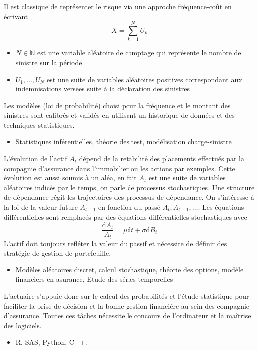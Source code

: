 \documentclass[8pt,notheorems]{beamer}
\theoremstyle{definition}
\theoremstyle{example}
\theoremstyle{mystyle}
\theoremstyle{plain}
\begin{document}
\begin{frame}[allowframebreaks]
Il est classique de représenter le risque via une approche fréquence-coût en écrivant 
$$
X = \sum_{k=1}^{N}U_k
$$ 
\begin{itemize}
    \item $N\in\mathbb{N}$ est une variable aléatoire de comptage qui représente le nombre de sinistre sur la période
    \item $U_1,\ldots,U_N$ est une suite de variables aléatoires positives correspondant aux indemnisations versées suite à la déclaration des sinistres
\end{itemize}
Les modèles (loi de probabilité) choisi pour la fréquence et le montant des sinistres sont calibrés et validés en utilisant un historique de données et des techniques statistiques.
\begin{itemize}
    \item Statistiques inférentielles, théorie des test, modélisation charge-sinistre
\end{itemize}
\end{frame}
\begin{frame}[allowframebreaks]
L'évolution de l'actif $A_t$ dépend de la retabilité des placements effectués par la compagnie d'assurance dans l'immobilier ou les actions par exemples. Cette évolution est aussi soumis à un aléa, en fait $A_t$ est une suite de variables aléatoires indicés par le temps, on parle de processus stochastiques. Une structure de dépendance régit les trajectoires des processus de dépendance. On s'intéresse à la loi de la valeur future $A_{t+1}$ en fonction du passé $A_{t}, A_{t-1},\ldots$. Les équations différentielles sont remplacés par des équations différentielles stochastiques avec
$$
\frac{\text{d}A_t}{A_t} = \mu\text{d}t+\sigma\text{d}B_t
$$
L'actif doit toujours refléter la valeur du passif et nécessite de définir des stratégie de gestion de portefeuille. 
\begin{itemize}
    \item Modèles aléatoires discret, calcul stochastique, théorie des options, modèle financiers en asurance, Etude des séries temporelles 
\end{itemize} 
L'actuaire s'appuie donc sur le calcul des probabilités et l'étude statistique pour faciliter la prise de décision et la bonne gestion financière au sein des compagnie d'assurance. Toutes ces tâches nécessite le concours de l'ordinateur et la maîtrise des logiciels.
\begin{itemize}
    \item R, SAS, Python, C++. 
\end{itemize} 

\end{frame}
\end{document}
